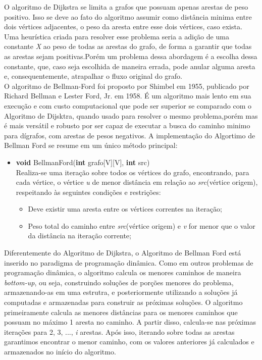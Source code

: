 \documentclass[12pt]{article}
\begin{document}
O algoritmo de Dijkstra se limita a grafos que possuam apenas  arestas de peso  positivo. Isso se deve ao fato do algoritmo  assumir  como distância minima entre dois vértices adjacentes, o peso da aresta entre esse dois vértices, caso exista. Uma heurística criada  para resolver esse problema seria a adição de uma constante \textit{X} ao peso de todas as arestas do grafo, de forma a garantir que todas as arestas sejam positivas.Porém um problema dessa abordagem é a escolha dessa constante, que, caso seja escolhida de maneira errada, pode anular alguma aresta e, consequentemente, atrapalhar o fluxo original do grafo.
\\O algoritmo de Bellman-Ford foi proposto por Shimbel em 1955, publicado por Richard Bellman e Lester Ford, Jr. em 1958. É um algoritmo mais  lento em sua execução e com custo computacional que pode ser superior  se comparado com  o Algoritmo de Dijsktra, quando usado para resolver o mesmo problema,porém  mas é mais versátil e robusto por ser capaz de executar a busca do caminho minimo para dígrafos, com arestas de pesos negativos. A implementação do Algortimo de Bellman Ford se resume em um único método  principal:

\begin{itemize}
\item \textbf{void} BellmanFord(\textbf{int} grafo[V][V], \textbf{int} src)\\ 
Realiza-se uma iteração  sobre todos os vértices do grafo, encontrando, para cada vértice, o vértice \textit{u} de menor distância em relação ao \textit{src}(vértice origem), respeitando às seguintes condições e restrições:
\begin{itemize}
\item Deve existir uma aresta entre os vértices correntes na iteração;
\item Peso total do caminho entre \textit{src}(vértice origem) e \textit{v} for menor que o valor da distância na iteração corrente;
\end{itemize}
\end{itemize}
Diferentemente do Algoritmo de Dijkstra, o Algoritmo de Bellman Ford está inserido no paradigma de programação dinâmica.
Como em outros problemas de programação dinâmica, o algoritmo calcula os menores caminhos de maneira \textit{bottom-up}, ou seja, construindo soluções de porções menores do problema, armazenando-as em uma estrutra, e posteriormente utilizando a soluções já computadas e  armazenadas para construir  as próximas soluções. O algoritmo primeiramente calcula as menores distâncias para os menores caminhos que possuam no máximo 1 aresta no caminho. A partir disso, calcula-se nas próximas iterações para 2, 3, ..., \textit{i} arestas. Após isso, iterando sobre todas as arestas garantimos encontrar o menor caminho, com os valores anteriores já calculados e armazenados  no início do algoritmo.
\end{document}
